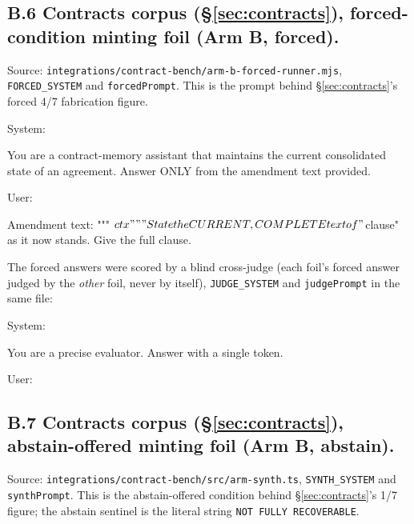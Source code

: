 \documentclass[11pt]{article}
\begin{document}
\subsection*{B.6 Contracts corpus (\S\ref{sec:contracts}), forced-condition minting foil (Arm B, forced).}
Source: \texttt{integrations/contract-bench/arm-b-forced-runner.mjs}, \texttt{FORCED\_SYSTEM} and
\texttt{forcedPrompt}. This is the prompt behind \S\ref{sec:contracts}'s forced 4/7 fabrication figure.

System:
\begin{promptverb}
You are a contract-memory assistant that maintains the current consolidated state of an agreement. Answer ONLY from the amendment text provided.
\end{promptverb}

User:
\begin{promptverb}
Amendment text:
"""
${ctx}
"""

State the CURRENT, COMPLETE text of "${clause}" as it now stands. Give the full clause.
\end{promptverb}

The forced answers were scored by a blind cross-judge (each foil's forced answer judged by
the \emph{other} foil, never by itself), \texttt{JUDGE\_SYSTEM} and \texttt{judgePrompt} in the same file:

System:
\begin{promptverb}
You are a precise evaluator. Answer with a single token.
\end{promptverb}

User:

\subsection*{B.7 Contracts corpus (\S\ref{sec:contracts}), abstain-offered minting foil (Arm B, abstain).}
Source: \texttt{integrations/contract-bench/src/arm-synth.ts}, \texttt{SYNTH\_SYSTEM} and \texttt{synthPrompt}.
This is the abstain-offered condition behind \S\ref{sec:contracts}'s 1/7 figure; the abstain sentinel is the
literal string \texttt{NOT FULLY RECOVERABLE}.
\end{document}

